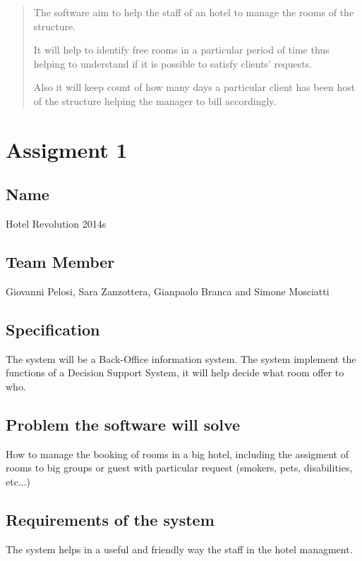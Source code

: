 \begin{abstract}
The software aim to help the staff of an hotel to manage the rooms of the structure.

It will help to identify free rooms in a particular period of time thus helping to understand if it is possible to satisfy clients' requests.

Also it will keep count of how many days a particular client has been host of the structure helping the manager to bill accordingly.
\end{abstract}

\section{Assigment 1}

\subsection{Name}
Hotel Revolution 2014s

\subsection{Team Member}
Giovanni Pelosi, Sara Zanzottera, Gianpaolo Branca and Simone Mosciatti

\subsection{Specification}
The system will be a Back-Office information system.
The system implement the functions of a Decision Support System, it will help decide what room offer to who.

\subsection{Problem the software will solve}
How to manage the booking of rooms in a big hotel, including the assigment of rooms to big groups or guest with particular request (smokers, pets, disabilities, etc...)

\subsection{Requirements of the system}
The system helps in a useful and friendly way the staff in the hotel managment.

